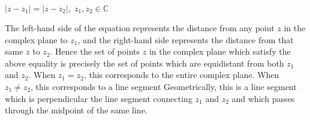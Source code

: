 $ \left| z - z_1 \right| = \left| z - z_2 \right|, \; z_1, z_2 \in \mathbb{C} $

\begin{solution}
    The left-hand side of the equation represents the distance from any point $z$ in the complex plane to $z_1$, and the
    right-hand side represents the distance from that same $z$ to $z_2$. Hence the set of points $z$ in the complex 
    plane which satisfy the above equality is precisely the set of points which are equidistant from both $z_1$ and 
    $z_2$. When $z_1 = z_2$, this corresponds to the entire complex plane. When $z_1 \neq z_2$, this corresponds to a 
    line segment Geometrically, this is a line segment which is perpendicular the line segment connecting $z_1$ and 
    $z_2$ and which passes through the midpoint of the same line.
    \ \\
\end{solution}